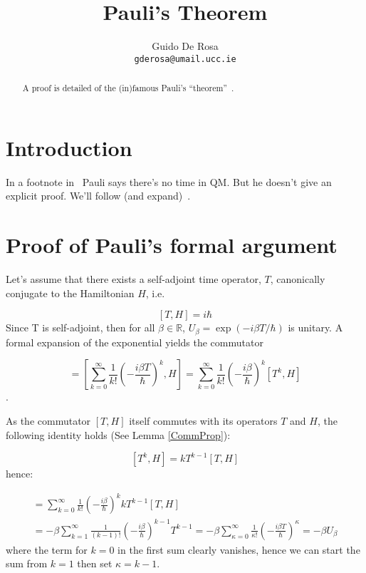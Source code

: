 \documentclass[a4paper]{article}
\author{Guido De Rosa \\ \small\tt{gderosa@umail.ucc.ie}}
\title{Pauli's Theorem}
\begin{document}
\maketitle

\begin{abstract}
A proof is detailed of the (in)famous Pauli's ``theorem''~\cite[footnote~2]{PauliFootnote}.
\end{abstract}

\section{Introduction}

In a footnote in~\cite{PauliFootnote} Pauli says there's no time in QM. But he
doesn't give an explicit proof. We'll follow (and expand)~\cite{Galapon2002}.

\section{Proof of Pauli's formal argument}\label{proof}

Let's assume that there exists a self-adjoint time operator, $T$, canonically conjugate
to the Hamiltonian $H$, i.e.

\begin{equation}
\label{THcommutator}
[T, H] = i\hbar
\end{equation}
Since T is self-adjoint, then for all
$\beta\in\mathbb{R}$, $U_{\beta} = \exp(- i \beta T / \hbar)$
is unitary. A formal
expansion of the exponential yields the commutator

\begin{equation}
[U_{\beta}, H]  = 
\left[
    \sum_{k=0}^{\infty} \frac{1}{k!} \left(- \frac{i\beta T}{\hbar} \right)^k, H
\right]         =
\sum_{k=0}^{\infty} \frac{1}{k!} \left(- \frac{i\beta}{\hbar} \right)^k [T^k, H]
\end{equation}.

As the commutator $[T, H]$ itself commutes with its operators $T$ and $H$,
the following identity holds (See Lemma \ref{CommProp}):

$$
[T^k, H] = kT^{k-1}[T, H]
$$
hence:

\begin{multline}
[U_{\beta}, H]  = 
\sum_{k=0}^{\infty} \frac{1}{k!} \left(- \frac{i\beta}{\hbar} \right)^k kT^{k-1}[T, H] \\ =
-\beta\sum_{k=1}^{\infty} \frac{1}{(k-1)!} \left(- \frac{i\beta}{\hbar} \right)^{k-1} T^{k-1} =
-\beta\sum_{\kappa=0}^{\infty} \frac{1}{\kappa!} \left(- \frac{i\beta T}{\hbar} \right)^{\kappa}  =
-\beta U_{\beta}
\end{multline}
where the term for $k=0$ in the first sum clearly vanishes, hence we can start the sum from 
$k=1$ then set $\kappa=k-1$.
\end{document}
